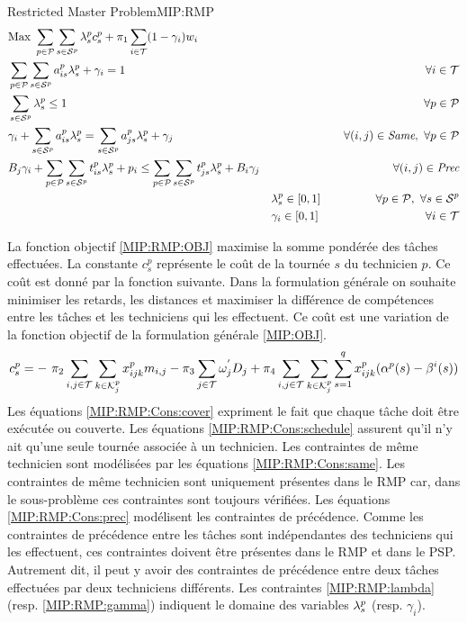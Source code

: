 \begin{modelIP}{Restricted Master Problem}{MIP:RMP}
\begin{align}
&\text{Max}~ \sum_{p \in \mathcal{P}}\sum_{s \in \mathcal{S}^{p}}\lambda_{s}^{p} c^p_{s} + \pi_1\sum_{i \in \mathcal{T}}(1-\gamma_i)w_i &&~~ &&& \label{MIP:RMP:OBJ}\\
 &\sum_{p \in \mathcal{P}}\sum_{s \in \mathcal{S}^{p}} a_{is}^p \lambda_{s}^{p} + \gamma_i = 1&& ~~ &&&\forall i \in \mathcal{T} \label{MIP:RMP:Cons:cover}\\
&\sum_{s \in \mathcal{S}^{p}} \lambda_{s}^{p} \leq 1&& ~~&&&\forall p \in \mathcal{P}\label{MIP:RMP:Cons:schedule}\\
&\gamma_{i} + \sum_{s \in \mathcal{S}^{p}} a_{is}^p \lambda_{s}^{p} = \sum_{s \in \mathcal{S}^{p}} a_{js}^p \lambda_{s}^{p} +\gamma_{j}&&~~ &&&\forall (i,j) \in \textit{Same},~ \forall p \in \mathcal{P} \label{MIP:RMP:Cons:same}\\
&B_j\gamma_i + \sum_{p \in \mathcal{P}}\sum_{s \in \mathcal{S}^{p}} t_{is}^p\lambda_{s}^{p} + p_i \leq \sum_{p \in \mathcal{P}}\sum_{s \in \mathcal{S}^{p}} t_{js}^p\lambda_{s}^{p} + B_i\gamma_j&& &&&\forall (i,j) \in \textit{Prec}\label{MIP:RMP:Cons:prec}\\
& && \lambda_{s}^{p} \in [0,1] &&& \forall p\in \mathcal{P}, ~\forall s\in \mathcal{S}^{p}\label{MIP:RMP:lambda}\\
& && \gamma_i \in [0,1]&&& \forall i\in \mathcal{T}\label{MIP:RMP:gamma}
\end{align}
\end{modelIP}

La fonction objectif \eqref{MIP:RMP:OBJ} maximise la somme pondérée des tâches effectuées.
La constante $c_{s}^p$ représente le coût de la tournée $s$ du technicien $p$. Ce coût est donné par la fonction suivante. Dans la formulation générale on souhaite minimiser les retards, les distances et maximiser la différence de compétences entre les tâches et les techniciens qui les effectuent. Ce coût est une variation de la fonction objectif de la formulation générale \ref{MIP:OBJ}.
$$
c^p_s = -~ \pi_2\sum_{i,j \in \mathcal{T}^{}}\sum_{k \in \mathcal{K}_{j}^{p}}x_{ijk}^{p}m_{i,j}  - \pi_3\sum_{j \in \mathcal{T}}\omega^{'}_jD_j +  \pi_4 \sum_{i,j \in \mathcal{T}^{}}\sum_{k \in \mathcal{K}_{j}^{p}}\sum_{s=1}^qx_{ijk}^{p}(\alpha^{p}(s)-\beta^{i}(s)) 
$$
Les équations \eqref{MIP:RMP:Cons:cover} expriment le fait que chaque tâche doit être exécutée ou couverte.
Les équations \eqref{MIP:RMP:Cons:schedule} assurent qu'il n'y ait qu'une seule tournée associée à un technicien.
Les contraintes de même technicien sont modélisées par les équations \eqref{MIP:RMP:Cons:same}. Les contraintes de même technicien sont uniquement présentes dans le RMP car, dans le sous-problème ces contraintes sont toujours vérifiées.
Les équations \eqref{MIP:RMP:Cons:prec} modélisent les contraintes de précédence. Comme les contraintes de précédence entre les tâches sont indépendantes des techniciens qui les effectuent, ces contraintes doivent être présentes dans le RMP et dans le PSP. 
Autrement dit, il peut y avoir des contraintes de précédence entre deux tâches effectuées par deux techniciens différents.
Les contraintes \eqref{MIP:RMP:lambda} (resp. \eqref{MIP:RMP:gamma})  indiquent le domaine des variables $\lambda_{s}^{p}$ (resp. $\gamma_i$).

